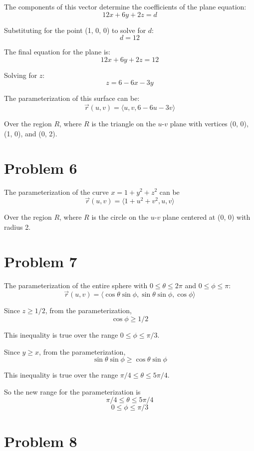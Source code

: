 \documentclass{article}
\begin{document}
The components of this vector determine the coefficients of the plane equation:
$$ 12 x + 6 y + 2 z = d $$

Substituting for the point (1, 0, 0) to solve for $d$:
$$ d = 12 $$

The final equation for the plane is:
$$ 12 x + 6 y + 2z = 12 $$

Solving for $z$:
$$ z = 6 - 6 x - 3 y $$

The parameterization of this surface can be:
$$ \vec{r}(u, v) = \langle u, v, 6 - 6u - 3v \rangle $$

Over the region $R$, where $R$ is the triangle on the $u$-$v$ plane with
vertices (0, 0), (1, 0), and (0, 2).

\section*{Problem 6}

The parameterization of the curve $x = 1 + y^2 + z^2$ can be
$$ \vec{r}(u, v) = \langle 1 + u^2 + v^2, u, v \rangle $$

Over the region $R$, where $R$ is the circle on the $u$-$v$ plane centered at
(0, 0) with radius 2. 

\section*{Problem 7}

The parameterization of the entire sphere with $0 \leq \theta \leq 2 \pi$ and $0
\leq \phi \leq \pi$:
$$ \vec{r}(u, v) = \langle \cos \theta \sin \phi, \sin \theta \sin \phi, \cos
\phi \rangle $$

Since $z \geq 1/2$, from the parameterization,
$$ \cos \phi \geq 1/2 $$

This inequality is true over the range $ 0 \leq \phi \leq \pi/3$.

\bigbreak

Since $y \geq x$, from the parameterization,
$$ \sin \theta \sin \phi \geq \cos \theta \sin \phi $$

This inequality is true over the range $ \pi / 4 \leq \theta \leq 5 \pi / 4 $.

\bigbreak

So the new range for the parameterization is
$$ \pi / 4 \leq \theta \leq 5 \pi / 4 $$
$$ 0 \leq \phi \leq \pi / 3 $$

\section*{Problem 8}
\end{document}
